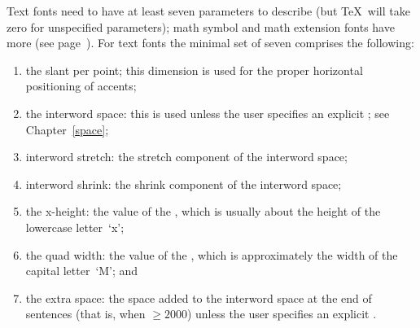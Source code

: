 \documentclass{book}
\begin{document}
Text fonts need to have at least seven  parameters
to describe 
(but \TeX\ will take zero for unspecified parameters);
math symbol and math extension fonts have more
(see page~\pageref{fam23:fontdims}).
For text fonts the minimal set of seven comprises the following:
\begin{enumerate} \item the slant per point; this dimension is used
    for the proper horizontal positioning of accents;
\item the interword space: this is used unless the user
    specifies an explicit ;
    see Chapter~\ref{space};
\item interword stretch: the stretch component of the interword
    space;
\item interword shrink: the shrink component of
    the interword space;
\item the x-height: the value of
    the  , which is usually about the
    height of the lowercase letter~`x';
\item the quad width:
    the value of the  , which is
    approximately the width of the capital letter~`M'; and
\item the extra space: the space added to the interword space
at the end of sentences (that is, when ${}\geq2000$)
unless the user specifies an explicit .
\end{enumerate}
\end{document}
